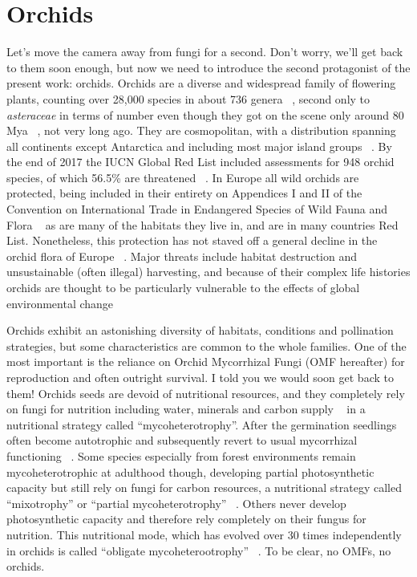 \chapter{Orchids}
\label{orchids}

Let's move the camera away from fungi for a second. Don't worry, we'll get back to them soon enough, but now we need to introduce the second protagonist of the present work: orchids.
Orchids are a diverse and widespread family of flowering plants, counting over 28,000 species in about 736 genera ~\citep{christenhusz2016}, second only to \emph{asteraceae} in terms of number even though they got on the scene only around 80 Mya ~\citep{ramirez2007}, not very long ago. They are cosmopolitan, with a distribution spanning all continents except Antarctica and including most major island groups ~\citep{givnish2016}.
By the end of 2017 the IUCN Global Red List included assessments for 948 orchid species, of which 56.5\% are threatened ~\citep{fay2018}. In Europe all wild orchids are protected, being included in their entirety on Appendices I and II of the Convention on International Trade in Endangered Species of Wild Fauna and Flora ~\citep{CITES-1} as are many of the habitats they live in, and are in many countries Red List. Nonetheless, this protection has not staved off a general decline in the orchid flora of Europe ~\citep{kull2006, jacquemyn2005}. Major threats include habitat destruction and unsustainable (often illegal) harvesting, and because of their complex life histories orchids are thought to be particularly vulnerable to the effects of global environmental change ~\citep{gale2018, kull2016}

Orchids exhibit an astonishing diversity of habitats, conditions and pollination strategies, but some characteristics are common to the whole families. One of the most important is the reliance on Orchid Mycorrhizal Fungi (OMF hereafter) for reproduction and often outright survival. I told you we would soon get back to them!
Orchids seeds are devoid of nutritional resources, and they completely rely on fungi for nutrition including water, minerals and carbon supply ~\citep{leake1994, rasmussen1998, merckx2013} in a nutritional strategy called ``mycoheterotrophy''. After the germination seedlings often become autotrophic and subsequently revert to usual mycorrhizal functioning ~\citep{cameron2008, rasmussen1995}. Some species especially from forest environments remain mycoheterotrophic at adulthood though, developing partial photosynthetic capacity but still rely on fungi for carbon resources, a nutritional strategy called ``mixotrophy'' or ``partial mycoheterotrophy'' ~\citep{gebauer2003, julou2005, selosse2009}. Others never develop photosynthetic capacity and therefore rely completely on their fungus for nutrition. This nutritional mode, which has evolved over 30 times independently in orchids is called ``obligate mycoheterootrophy'' ~\citep{merckx2013}. To be clear, no OMFs, no orchids.


